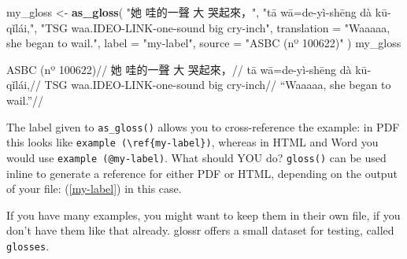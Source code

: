 \documentclass[
]{article}
\newenvironment{Shaded}{\begin{snugshade}}{\end{snugshade}}
\newcommand{\AttributeTok}[1]{\textcolor[rgb]{0.13,0.29,0.53}{#1}}
\newcommand{\FunctionTok}[1]{\textcolor[rgb]{0.13,0.29,0.53}{\textbf{#1}}}
\newcommand{\NormalTok}[1]{#1}
\newcommand{\OtherTok}[1]{\textcolor[rgb]{0.56,0.35,0.01}{#1}}
\newcommand{\StringTok}[1]{\textcolor[rgb]{0.31,0.60,0.02}{#1}}
\begin{document}
\begin{Shaded}
\begin{Highlighting}[]
\NormalTok{my\_gloss }\OtherTok{\textless{}{-}} \FunctionTok{as\_gloss}\NormalTok{(}
  \StringTok{"她 哇的一聲 大 哭起來，"}\NormalTok{,}
  \StringTok{"tā wā=de{-}yì{-}shēng dà kū{-}qǐlái,"}\NormalTok{,}
  \StringTok{"TSG waa.IDEO{-}LINK{-}one{-}sound big cry{-}inch"}\NormalTok{,}
  \AttributeTok{translation =} \StringTok{"Waaaaa, she began to wail."}\NormalTok{,}
  \AttributeTok{label =} \StringTok{"my{-}label"}\NormalTok{,}
  \AttributeTok{source =} \StringTok{"ASBC (nº 100622)"}
\NormalTok{)}
\NormalTok{my\_gloss}
\end{Highlighting}
\end{Shaded}

\ex\label{my-label} \begingl \glpreamble ASBC (nº 100622)// \gla 她 哇的一聲 大 哭起來，// \glb tā wā=de-yì-shēng dà kū-qǐlái,// \glc TSG waa.IDEO-LINK-one-sound big cry-inch// \glft ``Waaaaa, she began to wail.''//
\endgl \xe 

The label given to \texttt{as\_gloss()} allows you to cross-reference the example: in PDF this looks like \texttt{example\ (\textbackslash{}ref\{my-label\})}, whereas in HTML and Word you would use \texttt{example\ (@my-label)}. What should YOU do? \texttt{gloss()} can be used inline to generate a reference for either PDF or HTML, depending on the output of your file: (\ref{my-label}) in this case.

If you have many examples, you might want to keep them in their own file, if you don't have them like that already. glossr offers a small dataset for testing, called \texttt{glosses}.
\end{document}
